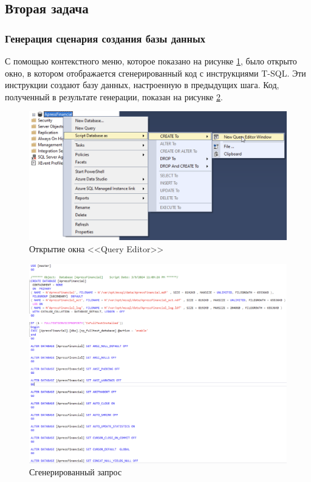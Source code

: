 \documentclass[a4paper, 14pt]{extarticle}
\begin{document}
\subsection{Вторая задача}

\subsubsection{Генерация сценария создания базы данных}

С помощью контекстного меню, которое показано на рисунке
\ref{fig:task-2/step-1.png}, было открыто окно, в котором отображается
сгенерированный код с инструкциями T-SQL. Эти инструкции создают базу данных,
настроенную в предыдущих шага. Код, полученный в результате генерации, показан
на рисунке \ref{fig:task-2/step-2.png}.

\begin{figure}[H]
  \centering
  \includegraphics[width=\textwidth]{images/task-2/step-1.png}
  \caption{Открытие окна <<Query Editor>>}
  \label{fig:task-2/step-1.png}
\end{figure}

\begin{figure}[H]
  \centering
  \includegraphics[width=\textwidth]{images/task-2/step-2.png}
  \caption{Сгенерированный запрос}
  \label{fig:task-2/step-2.png}
\end{figure}
\end{document}
